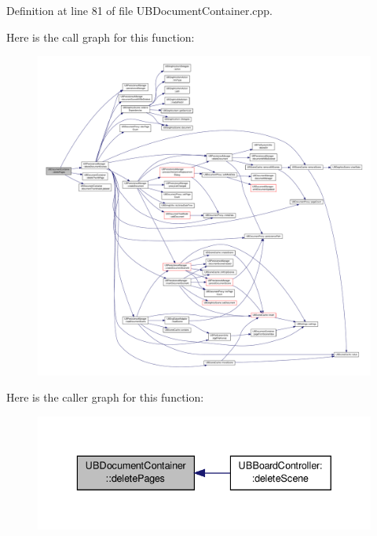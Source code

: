 Definition at line 81 of file U\-B\-Document\-Container.\-cpp.



Here is the call graph for this function\-:
\nopagebreak
\begin{figure}[H]
\begin{center}
\leavevmode
\includegraphics[width=350pt]{da/dc6/class_u_b_document_container_a156ab898f2b4ff3f12f1e6d5e3406a69_cgraph}
\end{center}
\end{figure}




Here is the caller graph for this function\-:
\nopagebreak
\begin{figure}[H]
\begin{center}
\leavevmode
\includegraphics[width=336pt]{da/dc6/class_u_b_document_container_a156ab898f2b4ff3f12f1e6d5e3406a69_icgraph}
\end{center}
\end{figure}


